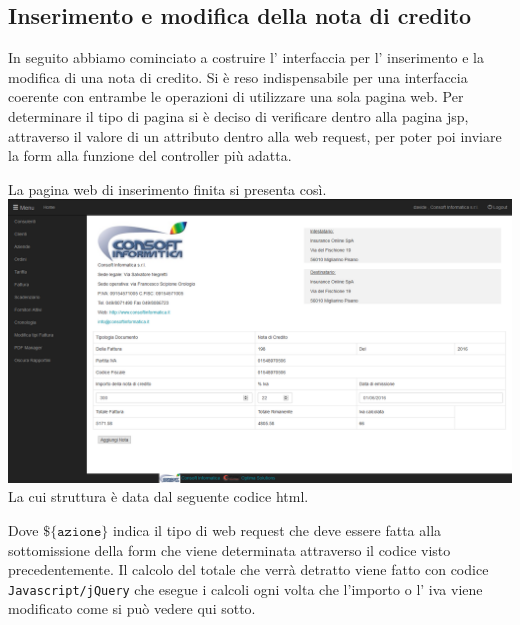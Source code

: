 \documentclass[12pt]{book}
\begin{document}
\subsection{Inserimento e modifica della nota di credito}
In seguito abbiamo cominciato a costruire l' interfaccia per l' inserimento 
e la modifica di una nota di credito.
Si è reso indispensabile per una interfaccia coerente con entrambe le operazioni
di utilizzare una sola pagina web.
Per determinare il tipo di pagina si è deciso di verificare dentro alla pagina
jsp, attraverso il valore di un attributo dentro alla web request, per poter poi 
inviare la form alla funzione del controller più adatta.

La pagina web di inserimento finita si presenta così.
\newline
\newline
\includegraphics[scale=0.4]{img/inserimento_nota_credito}
\newline
La cui struttura è data dal seguente codice html.

Dove \(\texttt{\$\{azione\}}\) indica il tipo di web request che deve essere
fatta alla sottomissione della form che viene determinata attraverso il 
codice visto precedentemente.
Il calcolo del totale che verrà detratto viene fatto 
con codice \texttt{Javascript/jQuery} che esegue i calcoli ogni 
volta che l'importo o l' iva viene modificato come si può vedere qui sotto.

\end{document}
